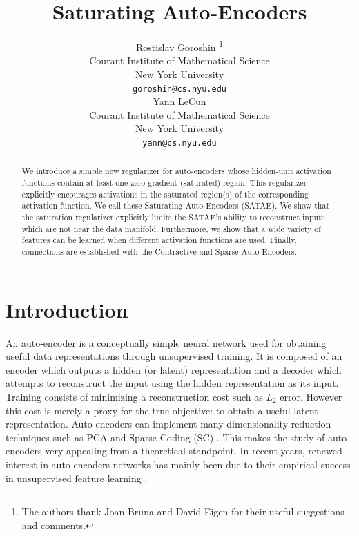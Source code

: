 \documentclass{article} %
\title{Saturating Auto-Encoders}
\author{
Rostislav Goroshin \thanks{The authors thank Joan Bruna and David Eigen for their useful suggestions and comments.} \\
Courant Institute of Mathematical Science\\
New York University \\
\texttt{goroshin@cs.nyu.edu} \\
\And
Yann LeCun \\
Courant Institute of Mathematical Science\\
New York University \\
\texttt{yann@cs.nyu.edu} \\
\date{} }
\begin{document}
\maketitle

\begin{abstract} 
We introduce a simple new regularizer for auto-encoders whose hidden-unit activation functions contain at least one zero-gradient (saturated) region. This regularizer explicitly encourages activations in the saturated region(s) of the corresponding activation function. We call these Saturating Auto-Encoders (SATAE). We show that the saturation regularizer explicitly limits the SATAE's ability to reconstruct inputs which are not near the data manifold. Furthermore, we show that a wide variety of features can be learned when different activation functions are used. Finally, connections are established with the Contractive and Sparse Auto-Encoders.    

\end{abstract} 
\section{Introduction} 
An auto-encoder is a conceptually simple neural network used for obtaining useful data representations through unsupervised training. It is composed of an encoder which outputs a hidden (or latent) representation and a decoder which attempts to reconstruct the input using the hidden representation as its input. Training consists of minimizing a reconstruction cost such as $L_2$ error. However this cost is merely a proxy for the true objective: to obtain a useful latent representation. Auto-encoders can  implement many dimensionality reduction techniques such as PCA and Sparse Coding (SC) \cite{DHS}\cite{SC}\cite{LISTA}. This makes the study of auto-encoders very appealing from a theoretical standpoint. In recent years, renewed interest in auto-encoders networks has mainly been due to their empirical success in unsupervised feature learning \cite{SAE1}\cite{SAE2}\cite{CAE}\cite{DAE}. \\
\end{document}
